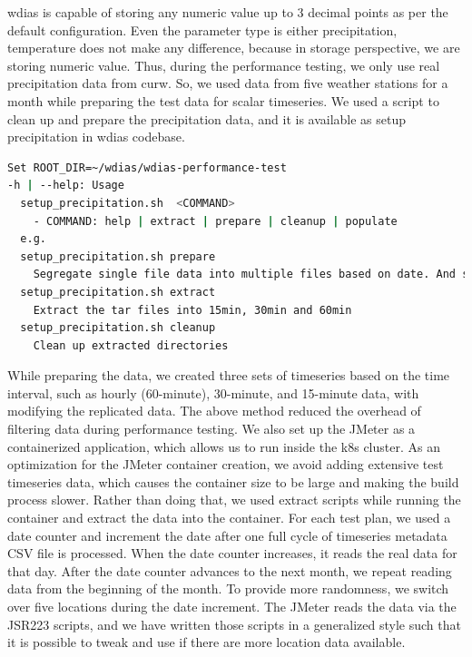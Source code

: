 \acrshort{wdias} is capable of storing any numeric value up to 3 decimal points as per the default configuration. Even the parameter type is either precipitation, temperature does not make any difference, because in storage perspective, we are storing numeric value. Thus, during the performance testing, we only use real precipitation data from \acrshort{curw}. So, we used data from five weather stations for a month while preparing the test data for scalar timeseries. We used a script to clean up and prepare the precipitation data, and it is available as setup precipitation in \acrshort{wdias} codebase.

\begin{minipage}{\linewidth}
\begin{lstlisting}[language=sh, caption=Preparation of precipitation data.]
Set ROOT_DIR=~/wdias/wdias-performance-test
-h | --help: Usage
  setup_precipitation.sh  <COMMAND>
    - COMMAND: help | extract | prepare | cleanup | populate
  e.g.
  setup_precipitation.sh prepare
    Segregate single file data into multiple files based on date. And separate into main directories of 15min, 30min, 60min and create tar files
  setup_precipitation.sh extract
    Extract the tar files into 15min, 30min and 60min
  setup_precipitation.sh cleanup
    Clean up extracted directories
\end{lstlisting}
\end{minipage}

While preparing the data, we created three sets of timeseries based on the time interval, such as hourly (60-minute), 30-minute, and 15-minute data, with modifying the replicated data. The above method reduced the overhead of filtering data during performance testing. We also set up the JMeter as a containerized application, which allows us to run inside the k8s cluster. As an optimization for the JMeter container creation, we avoid adding extensive test timeseries data, which causes the container size to be large and making the build process slower. Rather than doing that, we used extract scripts while running the container and extract the data into the container. For each test plan, we used a date counter and increment the date after one full cycle of timeseries metadata CSV file is processed. When the date counter increases, it reads the real data for that day. After the date counter advances to the next month, we repeat reading data from the beginning of the month. To provide more randomness, we switch over five locations during the date increment. The JMeter reads the data via the JSR223 scripts, and we have written those scripts in a generalized style such that it is possible to tweak and use if there are more location data available.

